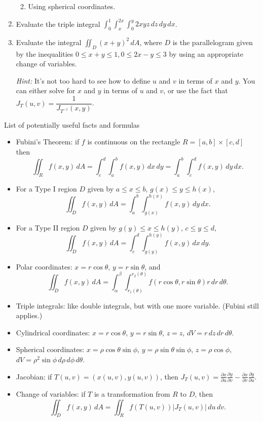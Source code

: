 \documentclass[12pt]{article}
\newcommand{\points}[1]{\marginpar{\hspace{24pt}[#1]}}
\newcommand{\di}{\displaystyle}
\begin{document}
\begin{enumerate}
\begin{enumerate}
\vspace{3.5in}

 \item Using spherical coordinates. \points{5}
\end{enumerate}

\newpage

\item Evaluate the  triple integral $\di \int_0^1\int_x^{2x}\int_0^y 2xyz\,dz\,dy\,dx$. \points{5}


\vspace{3in}

 \item Evaluate the integral $\di \iint_D (x+y)^2\,dA$, where $D$ is the parallelogram given by the inequalities $0\leq x+y\leq 1, 0\leq 2x-y\leq 3$ by using an appropriate change of variables. \points{5}

{\em Hint:} It's not too hard to see how to define $u$ and $v$ in terms of $x$ and $y$. You can either solve for $x$ and $y$ in terms of $u$ and $v$, or use the fact that $J_T(u,v) = \dfrac{1}{J_{T^{-1}}(x,y)}$.

\end{enumerate}
\newpage

\begin{center}
List of potentially useful facts and formulas
\end{center}
\begin{itemize}
\item Fubini's Theorem: if $f$ is continuous on the rectangle $R=[a,b]\times[c,d]$ then
\[
\iint_R f(x,y)\,dA = \int_c^d\int_a^bf(x,y)\,dx\,dy = \int_a^b\int_c^d f(x,y)\,dy\,dx.
\]
\item For a Type I region $D$ given by $a\leq x\leq b$, $g(x)\leq y\leq h(x)$,
\[
\iint_D f(x,y)\,dA = \int_a^b\int_{g(x)}^{h(x)}f(x,y)\,dy\,dx.
\]
\item For a Type II region $D$ given by $g(y)\leq x\leq h(y)$, $c\leq y\leq d$,
\[
\iint_D f(x,y)\,dA = \int_c^d\int_{g(y)}^{h(y)}f(x,y)\,dx\,dy.
\]
\item Polar coordinates: $x=r\cos\theta$, $y=r\sin\theta$, and
\[
\iint_D f(x,y)\,dA = \int_\alpha^\beta\int_{r_1(\theta)}^{r_2(\theta)}f(r\cos\theta,r\sin\theta)r\,dr\,d\theta.
\]
\item Triple integrals: like double integrals, but with one more variable. (Fubini still applies.)
\item Cylindrical coordinates: $x=r\cos\theta$, $y=r\sin\theta$, $z=z$, $dV = r\,dz\,dr\,d\theta$.
\item Spherical coordinates: $x=\rho\cos\theta\sin\phi$, $y=\rho\sin\theta\sin\phi$, $z=\rho\cos\phi$, $dV = \rho^2\sin\phi\,d\rho\,d\phi\,d\theta$.
\item Jacobian: if $T(u,v) = (x(u,v),y(u,v))$, then $\di J_T(u,v) = \frac{\partial x}{\partial u}\frac{\partial y}{\partial v}-\frac{\partial x}{\partial v}\frac{\partial y}{\partial u}$.
 \item Change of variables: if $T$ is a transformation from $R$ to $D$, then 
\[
 \iint_D f(x,y)\,dA = \iint_R f(T(u,v))\lvert J_T(u,v)\rvert\,du\,dv.
\]
\end{itemize}
\end{document}
